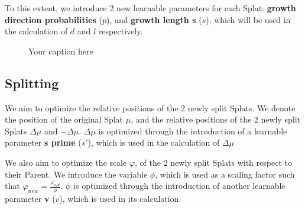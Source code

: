\documentclass[11pt]{report}
\begin{document}
To this extent, we introduce 2 new learnable parameters for each Splat: \textbf{growth direction probabilities} ($p$), and \textbf{growth length s} ($s$), which will be used in the calculation of $d$ and $l$ respectively.

\begin{figure}[H]
    \centering
    
    \caption{Your caption here}
    \label{fig:your_label}
\end{figure}

\subsection{Splitting}
We aim to optimize the relative positions of the 2 newly split Splats. We denote the position of the original Splat $\mu$, and the relative positions of the 2 newly split Splats $\Delta \mu$ and $- \Delta \mu$. $\Delta \mu$ is optimized through the introduction of a learnable parameter \textbf{s prime} ($s'$), which is used in the calculation of $\Delta \mu$

We also aim to optimize the scale $\varphi$, of the 2 newly split Splats with respect to their Parent. We introduce the variable $\phi$, which is used as a scaling factor such that $\varphi_{new} = \frac{\varphi_{old}}{\phi}$. $\phi$ is optimized through the introduction of another learnable parameter \textbf{v} ($v$), which is used in its calculation.
\end{document}
